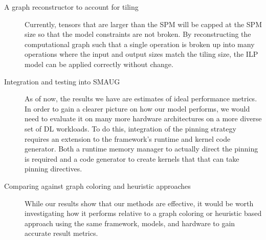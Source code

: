 \begin{description}
	\item [A graph reconstructor to account for tiling]
		Currently, tensors that are larger than the SPM will be capped
		at the SPM size so that the model constraints are not broken.
		By reconstructing the computational graph such that a single
		operation is broken up into many operations where the input and
		output sizes match the tiling size, the ILP model can be
		applied correctly without change.
	\item [Integration and testing into SMAUG]
		As of now, the results we have are estimates of ideal performance
		metrics. In order to gain a clearer picture on how our model
		performs, we would need to evaluate it on many more hardware
		architectures on a more diverse set of DL workloads. To do this,
		integration of the pinning strategy requires an extension to
		the framework's runtime and kernel code generator. Both a runtime
		memory manager to actually direct the pinning is required and 
		a code generator to create kernels that that can take pinning
		directives.
	\item [Comparing against graph coloring and heuristic approaches]
		While our results show that our methods are effective, it would
		be worth investigating how it performs relative to a graph
		coloring or heuristic based approach using the same framework,
		models, and hardware to gain accurate result metrics.
\end{description}
